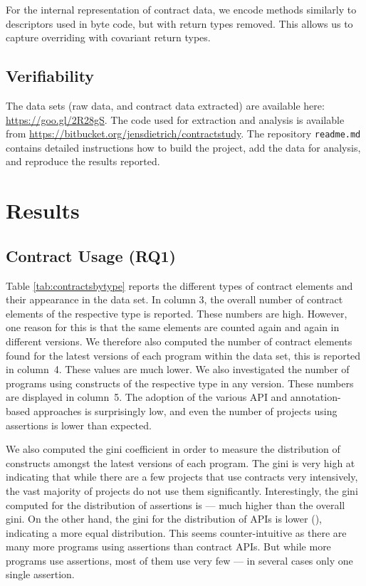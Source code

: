 \documentclass[a4paper,UKenglish]{lipics-v2016}
\begin{document}
For the internal representation of contract data, we encode methods similarly to descriptors used in byte code, but with return types removed. This allows us to capture overriding with covariant return types.

\subsection{Verifiability}

The data sets (raw data, and contract data extracted) are available here: \url{https://goo.gl/2R28gS}. The code used for extraction and analysis is available from \url{https://bitbucket.org/jensdietrich/contractstudy}. The repository \texttt{readme.md} contains detailed instructions how to build the project, add the data for analysis, and reproduce the results reported. 


\section{Results}

\subsection{Contract Usage (RQ1)}
\label{ssec:results:usage}

Table \ref{tab:contractsbytype} reports the different types of contract elements and their appearance in the data set. In column 3, the overall number of contract elements of the respective type is reported. These numbers are high. However, one reason for this is that the same elements are counted again and again in different versions. We therefore also computed the number of contract elements found for the latest versions of each program within the data set, this is reported in column~4. These values are much lower. We also investigated the number of programs using constructs of the respective type in any version. These numbers are displayed in column~5. The adoption of the various API and annotation-based approaches is surprisingly low, and even the number of projects using assertions is lower than expected.  
 

We also computed the gini coefficient \cite{goloshchapova2013application} in order to measure the distribution of constructs amongst the latest versions of each program. The gini is very high at  indicating that while there are a few projects that use contracts very intensively, the vast majority of projects do not use them significantly. Interestingly, the gini computed for the distribution of assertions  is  --- much higher than the overall gini. On the other hand, the gini for the distribution of APIs is lower (), indicating a more equal distribution. This seems counter-intuitive as there are many more programs using assertions than contract APIs. But while more programs use assertions, most of them use very few --- in several cases only one single assertion. 
\end{document}
